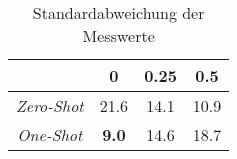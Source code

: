 \bgroup
\def\arraystretch{2}
\begin{table}[H]
	\vspace{.5cm}
	\centering		
	\begin{center}
		\begin{tabular}{|c||c|c|c|}
			\hline 
			& 0 & 0.25 & 0.5 \\
			\hline 
			\hline
			\textit{Zero-Shot} & 21.6 & 14.1 & 10.9 \\
			\hline
			\textit{One-Shot} & \textbf{9.0} & 14.6 & 18.7 \\
			\hline
		\end{tabular} 
	\end{center}
	\caption{Standardabweichung der Messwerte}
	\label{fig:o-var}
	\vspace{-.8cm}
\end{table}
\egroup